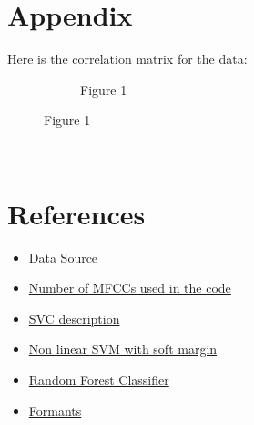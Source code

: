 \documentclass{article}
\begin{document}
\section*{Appendix}
Here is the correlation matrix for the data:\\
\begin{figure}
    \centering
    \begin{subfigure}[b]{0.3\textwidth}
        \centering
        
        \caption{Figure 1}
        \label{fig:image1}
    \end{subfigure}
\end{figure}\\

\newpage
\section*{References}
\begin{itemize}
    \item \href{https://huggingface.co/datasets/common_language}{Data Source}
    
    \item \href{https://ietresearch.onlinelibrary.wiley.com/doi/full/10.1049/tje2.12082#:~:text=All\%20performance\%20metrics\%20gave\%20the,studies\%20use\%20only\%2013\%20MFCCs}{Number of MFCCs used in the code}

    \item \href{https://scikit-learn.org/stable/modules/generated/sklearn.svm.SVC.html}{SVC description}
    
    \item \href{https://scikit-learn.org/stable/modules/svm.html#svm-kernels}{Non linear SVM with soft margin}
    
    \item \href{https://scikit-learn.org/stable/modules/generated/sklearn.ensemble.RandomForestClassifier.html}{Random Forest Classifier}
    \item \href{}{Formants}
\end{itemize}
\end{document}
